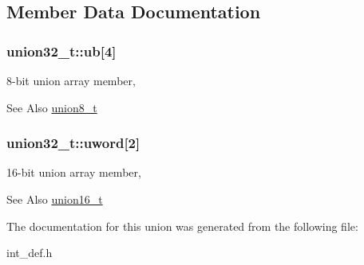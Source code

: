 \subsection{Member Data Documentation}
\hypertarget{unionunion32__t_af2870a5e20f8f9c9a7f13fa56b1d3346}{
\subsubsection[{ub}]{ union32\+\_\+t\+::ub\mbox{[}4\mbox{]}}}\label{unionunion32__t_af2870a5e20f8f9c9a7f13fa56b1d3346}


8-\/bit union array member, 

\begin{DoxySeeAlso}{See Also}
\hyperlink{unionunion8__t}{union8\+\_\+t} 
\end{DoxySeeAlso}
\hypertarget{unionunion32__t_a5a8da2aeb9d883c30f36685eb609d4cc}{
\subsubsection[{uword}]{ union32\+\_\+t\+::uword\mbox{[}2\mbox{]}}}\label{unionunion32__t_a5a8da2aeb9d883c30f36685eb609d4cc}


16-\/bit union array member, 

\begin{DoxySeeAlso}{See Also}
\hyperlink{unionunion16__t}{union16\+\_\+t} 
\end{DoxySeeAlso}


The documentation for this union was generated from the following file\+:\begin{DoxyCompactItemize}
\item 
int\+\_\+def.\+h\end{DoxyCompactItemize}
